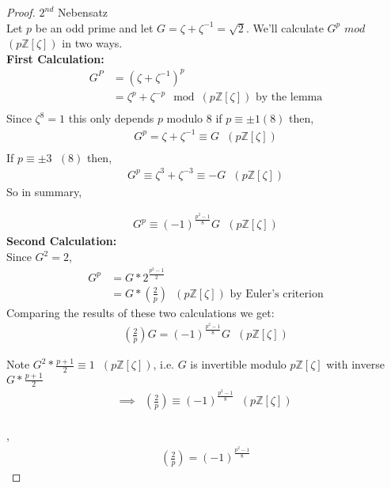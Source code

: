 \documentclass[11pt]{article}
\begin{document}
\newpage{}
\begin{proof}
	$2^{nd}$ Nebensatz\\[1em]

	Let $p$ be an odd prime and let $G = \zeta + \zeta^{-1} = \sqrt{2}$. We'll calculate $G^p$  $mod$  $ (p\mathbb{Z}[\zeta]) $ in two ways.\\

	\textbf{First Calculation: }
	\begin{align*}
		G^P &= (\zeta + \zeta^{-1})^p\\
		&= \zeta^p + \zeta^{-p} \mod (p\mathbb{Z}[\zeta]) \text{ by the lemma}\\
	\end{align*}
	Since $\zeta^8 = 1$ this only depends $p$ modulo 8 if $p \equiv \pm 1 (8)$ then, 
	\begin{align*}
		G^p = \zeta + \zeta^{-1} \equiv G \hspace{7pt}(p\mathbb{Z}[\zeta])\\
	\end{align*}
	If $p\equiv \pm 3 \hspace{7pt}(8)$ then, 
	\begin{align*}
	G^p \equiv \zeta^3 + \zeta^{-3} \equiv -G \hspace{7pt}(p\mathbb{Z}[\zeta])
	\end{align*}
	So in summary, 

	\begin{align*}
		G^{p} \equiv (-1)^{\frac{p^2-1}{8}}G \hspace{7pt}(p\mathbb{Z}[\zeta])
	\end{align*}
	\textbf{Second Calculation:}\\[1em]
	Since $G^2 = 2$,
	\begin{align*}
		G^p &= G * 2^{\frac{p^2-1}{2}} \\
		&= G * (\frac{2}{p})\hspace{7pt} (p\mathbb{Z}[\zeta]) \text{ by Euler's criterion} 
	\end{align*}
Comparing the results of these two calculations we get:
	\begin{align*}
		(\frac{2}{p}) G = (-1)^{\frac{p^2 -1}{8}} G \hspace{7pt}(p\mathbb{Z}[\zeta])
	\end{align*}

	Note $G^2 * \frac{p+1}{2} \equiv 1 \hspace{7pt}(p\mathbb{Z}[\zeta])$, i.e. $G$ is invertible modulo $p\mathbb{Z}[\zeta]$ with inverse $G*\frac{p+1}{2}$
	\begin{align*}
		\implies & (\frac{2}{p}) \equiv (-1)^{\frac{p^2-1}{8}} \hspace{7pt}(p\mathbb{Z}[\zeta])\\
	\end{align*}

		, 
	\begin{align*}
		(\frac{2}{p}) = (-1)^{\frac{p^2 -1}{8}}
	\end{align*}
\end{proof}
\end{document}

